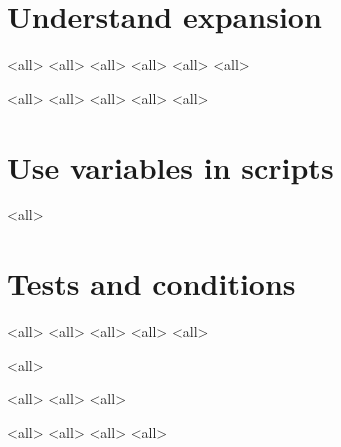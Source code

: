 \section{Understand expansion}
\mode<all>{}
\mode<all>{}
\mode<all>{}
\mode<all>{}
\mode<all>{}
\mode<all>{}

\mode<all>{}
\mode<all>{}
\mode<all>{}
\mode<all>{}
\mode<all>{}


\section{Use variables in scripts}

\mode<all>{}

\section{Tests and conditions}
\mode<all>{}
\mode<all>{}
\mode<all>{}
\mode<all>{}
\mode<all>{}

\mode<all>{}


\mode<all>{}
\mode<all>{}
\mode<all>{}

\mode<all>{}
\mode<all>{}
\mode<all>{}
\mode<all>{}

